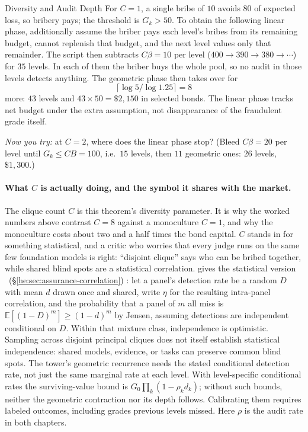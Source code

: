 \documentclass[11pt,a4paper]{article}
\theoremstyle{definition}
\begin{document}
\begin{pdexample}{Diversity and Audit Depth}
For $C=1$, a single bribe of $10$ avoids $80$ of expected loss, so bribery
pays; the threshold is $G_k>50$. To obtain the following linear
phase, additionally assume the briber pays each level's bribes from its
remaining budget, cannot replenish that budget, and the next level values
only that remainder. The script then subtracts $C\beta=10$ per level
($400 \to 390 \to 380 \to\cdots$) for $35$ levels. In each of them the briber
buys the whole pool, so no audit in those levels detects anything. The
geometric phase then takes over for
\[
  \lceil \log 5/\log 1.25\rceil = 8
\]
more: $43$ levels and $43\times50=\$2{,}150$ in selected bonds. The
linear phase tracks net budget under the extra assumption, not disappearance
of the fraudulent grade itself.

\emph{Now you try:} at $C=2$, where does the linear
phase stop? (Bleed $C\beta = 20$ per level until $G_k \le CB = 100$, i.e.\ $15$
levels, then $11$ geometric ones: $26$ levels, $\$1{,}300$.)
\end{pdexample}

\paragraph{What $C$ is actually doing, and the symbol it shares with the market.}
The clique count $C$ is this theorem's diversity parameter. It is why the
worked numbers above contrast $C=8$ against a monoculture $C=1$, and why the
monoculture costs about two and a half times the bond capital. $C$ stands in for something
statistical, and a critic who worries that every judge runs on the same few
foundation models is right: ``disjoint clique'' says who can be bribed
together, while shared blind spots are a statistical correlation.  gives the
statistical version%
\ifpdbook
\ (\S\ref{he:sec:assurance-correlation})%
\fi
: let a panel's
detection rate be a random $D$ with mean $d$ drawn once and shared, write
$\eta$ for the resulting intra-panel correlation, and the probability that a
panel of $m$ all miss is $\mathbb{E}[(1-D)^m] \ge (1-d)^m$ by Jensen,
assuming detections are independent conditional on $D$.
Within that mixture class, independence is optimistic. Sampling across disjoint
principal cliques does not itself establish statistical independence: shared
models, evidence, or tasks can preserve common blind spots.
The tower's geometric recurrence needs the stated conditional detection rate,
not just the same marginal rate at each level. With level-specific conditional
rates the surviving-value bound is $G_0\prod_k(1-\rho_kd_k)$; without such
bounds, neither the geometric contraction nor its depth follows.
Calibrating them requires labeled outcomes, including grades previous levels
missed. Here $\rho$ is the audit rate in both chapters.
\end{document}
